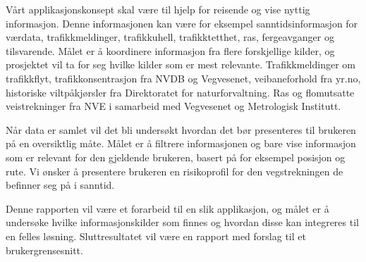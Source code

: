 \documentclass[a4paper,norsk,oneside]{book}
\begin{document}
Vårt applikasjonskonsept skal være til hjelp for reisende og vise nyttig informasjon.  Denne informasjonen kan være for eksempel sanntidsinformasjon for værdata, trafikkmeldinger, trafikkuhell, trafikktetthet, ras, fergeavganger og tilsvarende. Målet er å koordinere informasjon fra flere forskjellige kilder, og prosjektet vil ta for seg hvilke kilder som er mest relevante. Trafikkmeldinger om trafikkflyt,  trafikkonsentrasjon fra NVDB og Vegvesenet, veibaneforhold fra yr.no, historiske viltpåkjørsler fra Direktoratet for naturforvaltning. Ras og flomutsatte veistrekninger fra NVE i samarbeid med Vegvesenet og Metrologisk Institutt.
	
Når data er samlet vil det bli undersøkt hvordan det bør presenteres til brukeren på en oversiktlig måte. Målet er å filtrere informasjonen og bare vise informasjon som er relevant for den gjeldende brukeren, basert på for eksempel posisjon og rute. Vi ønsker å presentere brukeren en risikoprofil for den vegstrekningen de befinner seg på i sanntid.

Denne rapporten vil være et forarbeid til en slik applikasjon, og målet er å undersøke hvilke informasjonskilder som finnes og hvordan disse kan integreres til en felles løsning. Sluttresultatet vil være en rapport med forslag til et brukergrensesnitt. 
\end{document}
